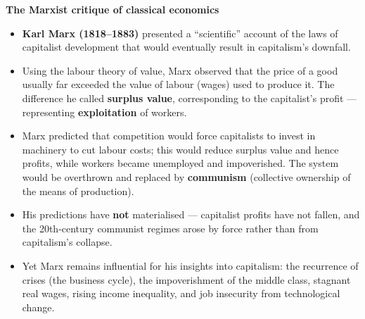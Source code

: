 \documentclass[a4paper,12pt]{article}
\begin{document}
\textbf{The Marxist critique of classical economics}
\begin{itemize}
  \item \textbf{Karl Marx (1818--1883)} presented a ``scientific'' account of the laws of capitalist development that would eventually result in capitalism's downfall.
  \item Using the labour theory of value, Marx observed that the price of a good usually far exceeded the value of labour (wages) used to produce it. The difference he called \textbf{surplus value}, corresponding to the capitalist's profit --- representing \textbf{exploitation} of workers.
  \item Marx predicted that competition would force capitalists to invest in machinery to cut labour costs; this would reduce surplus value and hence profits, while workers became unemployed and impoverished. The system would be overthrown and replaced by \textbf{communism} (collective ownership of the means of production).
  \item His predictions have \textbf{not} materialised --- capitalist profits have not fallen, and the 20th-century communist regimes arose by force rather than from capitalism's collapse.
  \item Yet Marx remains influential for his insights into capitalism: the recurrence of crises (the business cycle), the impoverishment of the middle class, stagnant real wages, rising income inequality, and job insecurity from technological change.
\end{itemize}
\end{document}
